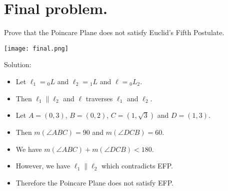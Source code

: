 \documentclass[12pt,openany]{report}
\begin{document}
\section*{Final problem.}

Prove that the Poincare Plane does not satisfy Euclid's Fifth Postulate.

\bigskip
\noindent
\texttt{[image: final.png]}

\bigskip
\noindent
Solution:

\begin{itemize}

\item[]
Let $\ell_1={}_{0}L$ and $\ell_2={}_1L$ and $\ell={}_0L_2$.

\item[]
Then $\ell_1\parallel\ell_2$ and $\ell$ traverses $\ell_1$ and $\ell_2$.

\item[]
Let $A=(0,3)$, $B=(0,2)$, $C=(1,\sqrt3)$ and $D=(1,3)$.

\item[]
Then $m(\angle ABC)=90$ and $m(\angle DCB)=60$.

\item[]
We have $m(\angle ABC)+m(\angle DCB)<180$.

\item[]
However, we have $\ell_1\parallel\ell_2$ which contradicts EFP.

\item[]
Therefore the Poincare Plane does not satisfy EFP.

\end{itemize}
\end{document}
